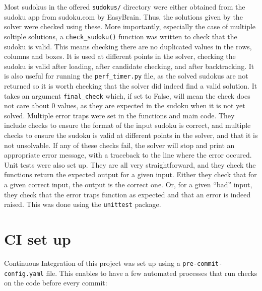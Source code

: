 \documentclass[12pt]{report} %
\begin{document}
Most sudokus in the offered \texttt{sudokus/} directory were either obtained from the sudoku app from sudoku.com\cite{sudoku_com} by EasyBrain. Thus, the solutions given by the solver were checked using these. More importantly, especially the case of multiple soltiple solutions, a \texttt{check\_sudoku()} function was written to check that the sudoku is valid. This means checking there are no duplicated values in the rows, columns and boxes. It is used at different points in the solver, checking the sudoku is valid after loading, after candidate checking, and after backtracking. It is also useful for running the \texttt{perf\_timer.py} file, as the solved sudokus are not returned so it is worth checking that the solver did indeed find a valid solution. It takes an argument \texttt{final\_check} which, if set to False, will mean the check does not care about 0 values, as they are expected in the sudoku when it is not yet solved.  
Multiple error traps were set in the functions and main code. They include checks to ensure the format of the input sudoku is correct, and multiple checks to ensure the sudoku is valid at different points in the solver, and that it is not unsolvable. If any of these checks fail, the solver will stop and print an appropriate error message, with a traceback to the line where the error occured.  
Unit tests were also set up. They are all very straightforward, and they check the functions return the expected output for a given input. Either they check that for a given correct input, the output is the correct one. Or, for a given ``bad'' input, they check that the error traps function as expected and that an error is indeed raised. This was done using the \texttt{unittest} package. 

\section{CI set up}

Continuous Integration of this project was set up using a \texttt{pre-commit-config.yaml} file. This enables to have a few automated processes that run checks on the code before every commit:
\end{document}
